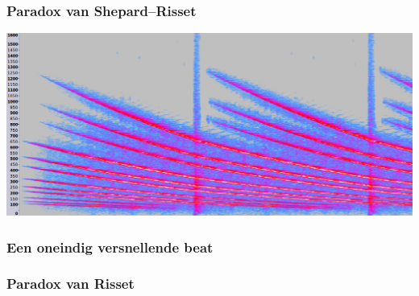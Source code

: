 \documentclass[compress, darktitle, framenumber, totalframenumber]{beamer}
\begin{document}
\begin{frame}
  \frametitle{Paradox van Shepard--Risset}

  \includegraphics[width=\textwidth]{images/glissando-spectrum.png}
\end{frame}

\begin{frame}
  \frametitle{Een oneindig versnellende beat}
\end{frame}

\begin{frame}
  \frametitle{Paradox van Risset}
\end{frame}
\end{document}
